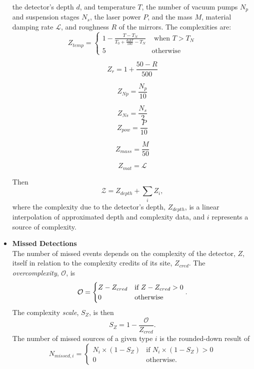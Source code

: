 \documentclass{article}
\begin{document}
\begin{itemize}
the detector's depth $d$, and temperature $T$, the number of vacuum
pumps $N_p$ and suspension stages $N_s$, the laser power $P$, and the
mass $M$, material damping rate $\mathcal{L}$, and roughness $R$ of
the mirrors. The complexities are:
        \[Z_{temp} = \begin{cases}
                     1 - \frac{T - T_N}{T_0 + \frac{d\Delta T}{100} - T_N} & \text{ when $T > T_N$} \\
                      5 & \text{otherwise}
                     \end{cases}
        \]
\begin{multicols}{2}   
        \[Z_{r} = 1 + \frac{50 - R}{500}
        \]
        
        \[Z_{Np} = \frac{N_p}{10}
        \]

        \[Z_{Ns} = \frac{N_s}{2}
        \]
        \break
        \[Z_{pow} = \frac{P}{10}
        \]

        \[Z_{mass} = \frac{M}{50}
        \]
        
        \[Z_{mat} = \mathcal{L}
        \]
\end{multicols}  
Then
\[
\mathcal{Z} = Z_{depth} + \sum_{i} Z_i,
\]
where the complexity due to the detector's depth, $Z_{depth}$, is a
linear interpolation of approximated depth and complexity data, and
$i$ represents a source of complexity.
\item\textbf{Missed Detections}\\
    The number of missed events depends on the complexity of the
    detector, $Z$, itself in relation to the complexity credits of its
    site, $Z_{cred}$. The \textit{overcomplexity}, $\mathcal{O}$, is
    \[
    \mathcal{O} = \begin{cases}
                  Z - Z_{cred} & \text{if $ Z - Z_{cred} > 0$} \\
                  0 & \text{otherwise}
                  \end{cases}.
    \]
    The complexity \textit{scale}, $S_{Z}$, is then
    \[
    S_{Z} = 1 - \frac{\mathcal{O}}{Z_{cred}}.
    \]
    The number of missed sources of a given type $i$ is the rounded-down result of
    \[
    N_{missed, i} = \begin{cases}
                    N_i \times (1 - S_Z) & \text{if $N_i \times (1 - S_Z) > 0$} \\
                    0 & \text{otherwise}.
                    \end{cases}
    \]
\end{itemize}
\end{document}
